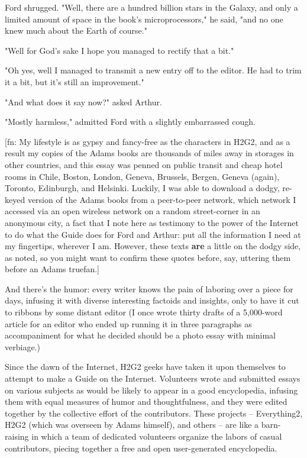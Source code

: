 Ford shrugged. "Well, there are a hundred billion stars in the
Galaxy, and only a limited amount of space in the book's
microprocessors," he said, "and no one knew much about the Earth of
course."

"Well for God's sake I hope you managed to rectify that a bit."

"Oh yes, well I managed to transmit a new entry off to the editor.
He had to trim it a bit, but it's still an improvement."

"And what does it say now?" asked Arthur.

"Mostly harmless," admitted Ford with a slightly embarrassed
cough.

[fn: My lifestyle is as gypsy and fancy-free as the characters in
H2G2, and as a result my copies of the Adams books are thousands of
miles away in storages in other countries, and this essay was
penned on public transit and cheap hotel rooms in Chile, Boston,
London, Geneva, Brussels, Bergen, Geneva (again), Toronto,
Edinburgh, and Helsinki. Luckily, I was able to download a dodgy,
re-keyed version of the Adams books from a peer-to-peer network,
which network I accessed via an open wireless network on a random
street-corner in an anonymous city, a fact that I note here as
testimony to the power of the Internet to do what the Guide does
for Ford and Arthur: put all the information I need at my
fingertips, wherever I am. However, these texts \textbf{are} a
little on the dodgy side, as noted, so you might want to confirm
these quotes before, say, uttering them before an Adams truefan.]

And there's the humor: every writer knows the pain of laboring over
a piece for days, infusing it with diverse interesting factoids and
insights, only to have it cut to ribbons by some distant editor (I
once wrote thirty drafts of a 5,000-word article for an editor who
ended up running it in three paragraphs as accompaniment for what
he decided should be a photo essay with minimal verbiage.)

Since the dawn of the Internet, H2G2 geeks have taken it upon
themselves to attempt to make a Guide on the Internet. Volunteers
wrote and submitted essays on various subjects as would be likely
to appear in a good encyclopedia, infusing them with equal measures
of humor and thoughtfulness, and they were edited together by the
collective effort of the contributors. These projects --
Everything2, H2G2 (which was overseen by Adams himself), and others
-- are like a barn-raising in which a team of dedicated volunteers
organize the labors of casual contributors, piecing together a free
and open user-generated encyclopedia.

